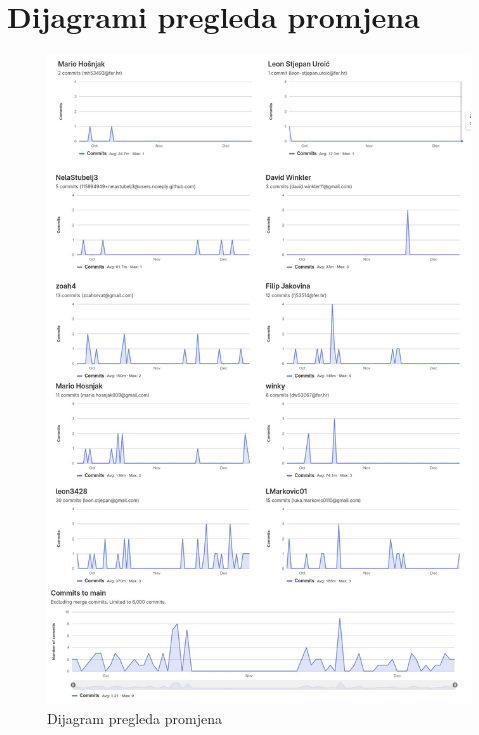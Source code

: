 \section*{Dijagrami pregleda promjena}
    \begin{figure}[H]
        \centering
        \includegraphics[scale=0.3]{Dokumentacija/img/promjene.jpg}
        \caption{Dijagram pregleda promjena}
    \end{figure}